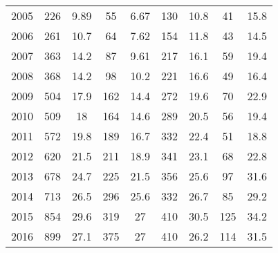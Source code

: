 \begin{table}[htbp]
\begin{tabular}{l*{8}{c}}
2005      &      226&     9.89&       55&     6.67&      130&     10.8&       41&     15.8\\
2006      &      261&     10.7&       64&     7.62&      154&     11.8&       43&     14.5\\
2007      &      363&     14.2&       87&     9.61&      217&     16.1&       59&     19.4\\
2008      &      368&     14.2&       98&     10.2&      221&     16.6&       49&     16.4\\
2009      &      504&     17.9&      162&     14.4&      272&     19.6&       70&     22.9\\
2010      &      509&       18&      164&     14.6&      289&     20.5&       56&     19.4\\
2011      &      572&     19.8&      189&     16.7&      332&     22.4&       51&     18.8\\
2012      &      620&     21.5&      211&     18.9&      341&     23.1&       68&     22.8\\
2013      &      678&     24.7&      225&     21.5&      356&     25.6&       97&     31.6\\
2014      &      713&     26.5&      296&     25.6&      332&     26.7&       85&     29.2\\
2015      &      854&     29.6&      319&       27&      410&     30.5&      125&     34.2\\
2016      &      899&     27.1&      375&       27&      410&     26.2&      114&     31.5\\
\hline\hline
\end{tabular}
\end{table}
